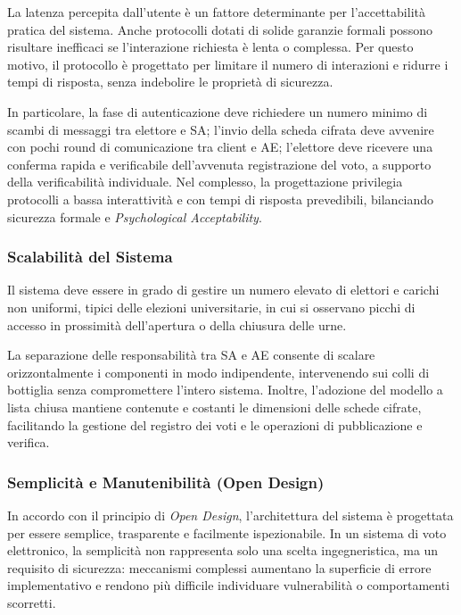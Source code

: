 \documentclass[12pt,a4paper]{article}
\begin{document}
La latenza percepita dall'utente è un fattore determinante per l'accettabilità pratica del
sistema. Anche protocolli dotati di solide garanzie formali possono risultare inefficaci se
l'interazione richiesta è lenta o complessa. Per questo motivo, il protocollo è progettato per
limitare il numero di interazioni e ridurre i tempi di risposta, senza indebolire le proprietà
di sicurezza.

In particolare, la fase di autenticazione deve richiedere un numero minimo di scambi di
messaggi tra elettore e SA; l'invio della scheda cifrata deve avvenire con pochi round di
comunicazione tra client e AE; l'elettore deve ricevere una conferma rapida e verificabile
dell'avvenuta registrazione del voto, a supporto della verificabilità individuale. Nel
complesso, la progettazione privilegia protocolli a bassa interattività e con tempi di risposta
prevedibili, bilanciando sicurezza formale e \textit{Psychological Acceptability}.

\subsubsection{Scalabilità del Sistema}

Il sistema deve essere in grado di gestire un numero elevato di elettori e carichi non
uniformi, tipici delle elezioni universitarie, in cui si osservano picchi di accesso in
prossimità dell'apertura o della chiusura delle urne.

La separazione delle responsabilità tra SA e AE consente di scalare orizzontalmente i
componenti in modo indipendente, intervenendo sui colli di bottiglia senza compromettere
l'intero sistema. Inoltre, l'adozione del modello a lista chiusa mantiene contenute e costanti
le dimensioni delle schede cifrate, facilitando la gestione del registro dei voti e le
operazioni di pubblicazione e verifica.

\subsubsection{Semplicità e Manutenibilità (Open Design)}

In accordo con il principio di \textit{Open Design}, l'architettura del sistema è progettata
per essere semplice, trasparente e facilmente ispezionabile. In un sistema di voto
elettronico, la semplicità non rappresenta solo una scelta ingegneristica, ma un requisito di
sicurezza: meccanismi complessi aumentano la superficie di errore implementativo e rendono più
difficile individuare vulnerabilità o comportamenti scorretti.
\end{document}

